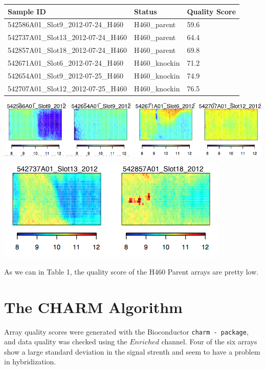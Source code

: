 \documentclass[11pt]{article}
\begin{document}
\begin{table}[H]
    \begin{tabular}{|l|l|l|}
    \hline
    Sample ID                        & Status       & Quality Score     \\ \hline
    542586A01\_Slot9\_2012-07-24\_H460 & H460\_parent & 59.6  \\ \hline
    542737A01\_Slot13\_2012-07-24\_H460 & H460\_parent & 64.4  \\ \hline
    542857A01\_Slot18\_2012-07-24\_H460 & H460\_parent & 69.8  \\ \hline
	542671A01\_Slot6\_2012-07-24\_H460 & H460\_knockin & 71.2  \\ \hline
    542654A01\_Slot9\_2012-07-25\_H460 & H460\_knockin & 74.9  \\ \hline    
    542707A01\_Slot12\_2012-07-25\_H460 & H460\_knockin & 76.5   \\ \hline
    \end{tabular}

\end{table}

\includegraphics[scale=0.5]{qcImage1.png}

\includegraphics[scale=0.5]{qcImage2.png}


As we can in Table 1, the quality score of the H460 Parent arrays are pretty low.

\section*{The CHARM Algorithm}

Array quality scores were generated with the  Bioconductor {\tt charm - package}, and data quality was checked using the $Enriched$ channel. Four of the six arrays show a large standard deviation in the signal strenth and seem to have a problem in hybridization.
\end{document}
